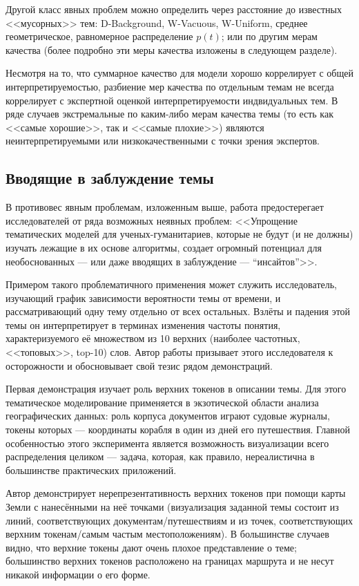 Другой класс явных проблем можно определить через расстояние до известных <<мусорных>> тем: D-Background, W-Vacuous, W-Uniform, среднее геометрическое, равномерное распределение $p(t)$; или по другим мерам качества (более подробно эти меры качества изложены в следующем разделе). 

Несмотря на то, что суммарное качество для модели хорошо коррелирует с общей интерпретируемостью, разбиение мер качества по отдельным темам не всегда коррелирует с экспертной оценкой интерпретируемости индвидуальных тем. В ряде случаев экстремальные по каким-либо мерам качества темы (то есть как <<самые хорошие>>, так и <<самые плохие>>) являются неинтерпретируемыми или низкокачественными с точки зрения экспертов.

\subsection{Вводящие в заблуждение темы}

В противовес явным проблемам, изложенным выше, работа \cite{dh_sea} предостерегает исследователей от ряда возможных неявных проблем: <<Упрощение тематических моделей для ученых-гуманитариев, которые не будут (и не должны) изучать лежащие в их основе алгоритмы, создает огромный потенциал для необоснованных --- или даже вводящих в заблуждение --- ``инсайтов''>>. 

Примером такого проблематичного применения может служить исследователь, изучающий график зависимости вероятности темы от времени, и рассматривающий одну тему отдельно от всех остальных. Взлёты и падения этой темы он интерпретирует в терминах изменения частоты понятия, характеризуемого её множеством из 10 верхних (наиболее частотных, <<топовых>>, top-10) слов. Автор работы призывает этого исследователя к осторожности и обосновывает свой тезис рядом демонстраций.

Первая демонстрация изучает роль верхних токенов  в описании темы. Для этого тематическое моделирование применяется в экзотической области анализа географических данных: роль корпуса документов играют судовые журналы, токены которых --- координаты корабля в один из дней его путешествия. Главной особенностью этого эксперимента является возможность визуализации всего распределения целиком --- задача, которая, как правило, нереалистична в большинстве практических приложений.

Автор демонстрирует нерепрезентативность верхних токенов при помощи карты Земли с нанесёнными на неё точками (визуализация заданной темы состоит из линий, соответствующих документам/путешествиям и из точек, соответствующих верхним токенам/самым частым местоположениям). В большинстве случаев видно, что верхние токены дают очень плохое представление о теме; большинство верхних токенов расположено на границах маршрута и не несут никакой информации о его форме. 

